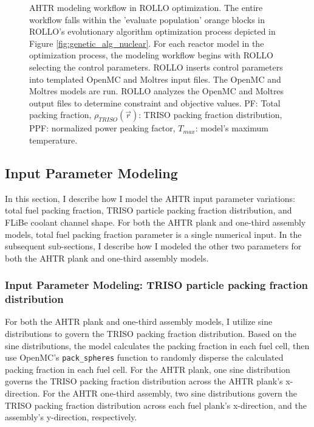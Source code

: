 \begin{figure}[htbp]
    \caption{\acrfull{AHTR} modeling workflow in \acrfull{ROLLO} optimization. The entire 
    workflow falls within the 'evaluate population' orange blocks in ROLLO's evolutionary 
    algorithm optimization process depicted in Figure \ref{fig:genetic_alg_nuclear}. 
    For each reactor model in the optimization process, the modeling workflow begins 
    with ROLLO selecting the control parameters. 
    ROLLO inserts control parameters into templated OpenMC and Moltres input files. 
    The OpenMC and Moltres models are run. 
    ROLLO analyzes the OpenMC and Moltres output files to determine constraint and 
    objective values.
    PF: Total packing fraction, $\rho_{TRISO}(\vec{r})$: TRISO packing fraction 
    distribution, PPF: normalized power peaking factor, $T_{max}$: model's maximum 
    temperature.} 
    \label{fig:ahtr-model-flow}
\end{figure}

\subsection{Input Parameter Modeling}
\label{sec:input-parameter-modeling}
In this section, I describe how I model the \gls{AHTR} input parameter variations: 
total fuel packing fraction, \gls{TRISO} particle packing fraction distribution, 
and \gls{FLiBe} coolant channel shape. 
For both the \gls{AHTR} plank and one-third assembly models, total fuel packing fraction 
parameter is a single numerical input.
In the subsequent sub-sections, I describe how I modeled the other two parameters for 
both the \gls{AHTR} plank and one-third assembly models. 

\subsubsection{Input Parameter Modeling: TRISO particle packing fraction distribution}
For both the \gls{AHTR} plank and one-third assembly models, I utilize sine 
distributions to govern the \gls{TRISO} packing fraction distribution. 
Based on the sine distributions, the model calculates the packing fraction in each fuel cell, then use 
OpenMC's \texttt{pack\_spheres} function to randomly disperse the calculated packing fraction in each 
fuel cell. 
For the \gls{AHTR} plank, one sine distribution governs the \gls{TRISO} packing fraction distribution 
across the \gls{AHTR} plank's x-direction. 
For the \gls{AHTR} one-third assembly, two sine distributions govern the \gls{TRISO} packing fraction 
distribution across each fuel plank's x-direction, and the assembly's y-direction, respectively. 

